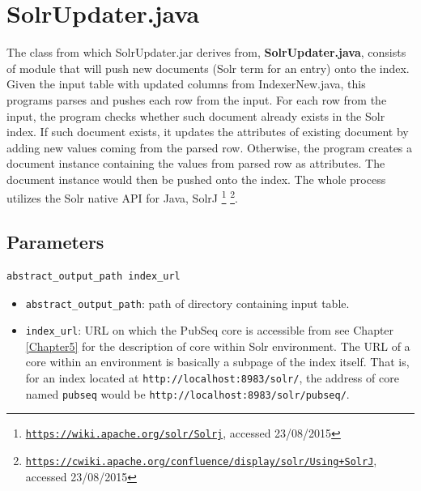 
\section{SolrUpdater.java}

The class from which SolrUpdater.jar derives from, \textbf{SolrUpdater.java}, consists of module that will push new documents (Solr term for an entry) onto the index. Given the input table with updated columns from IndexerNew.java, this programs parses and pushes each row from the input. For each row from the input, the program checks whether such document already exists in the Solr index. If such document exists, it updates the attributes of existing document by adding new values coming from the parsed row. Otherwise, the program creates a document instance containing the values from parsed row as attributes. The document instance would then be pushed onto the index. The whole process utilizes the Solr native API for Java, SolrJ \citep{grainger2014solr} \footnote{\href{https://wiki.apache.org/solr/Solrj}{\texttt{https://wiki.apache.org/solr/Solrj}}, accessed 23/08/2015} \footnote{\href{https://cwiki.apache.org/confluence/display/solr/Using+SolrJ}{\texttt{https://cwiki.apache.org/confluence/display/solr/Using+SolrJ}}, accessed 23/08/2015}.

\subsection{Parameters}

\begin{lstlisting}[breaklines]
abstract_output_path index_url
\end{lstlisting}

\begin{itemize}
\item \texttt{abstract\_output\_path}: path of directory containing input table.
\item \texttt{index\_url}: URL on which the PubSeq core is accessible from see Chapter \ref{Chapter5} for the description of core within Solr environment. The URL of a core within an environment is basically a subpage of the index itself. That is, for an index located at \texttt{http://localhost:8983/solr/}, the address of core named \texttt{pubseq} would be \texttt{http://localhost:8983/solr/pubseq/}.
\end{itemize}

